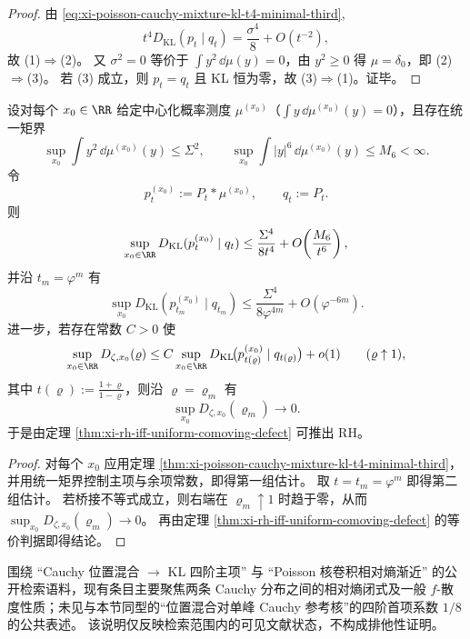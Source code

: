 \begin{proof}
由 \eqref{eq:xi-poisson-cauchy-mixture-kl-t4-minimal-third},
\[
t^4D_{\mathrm{KL}}(p_t\mid q_t)=\frac{\sigma^4}{8}+O(t^{-2}),
\]
故 (1)\(\Rightarrow\)(2)。
又 \(\sigma^2=0\) 等价于 \(\int y^2\,\dd\mu(y)=0\)，由 \(y^2\ge0\) 得 \(\mu=\delta_0\)，即 (2)\(\Rightarrow\)(3)。
若 (3) 成立，则 \(p_t=q_t\) 且 KL 恒为零，故 (3)\(\Rightarrow\)(1)。证毕。
\end{proof}

\begin{corollary}[统一矩界与桥接接口下的条件推导]\label{thm:xi-poisson-kl-bridge-variance-necessary-condition}\label{cor:xi-poisson-kl-bridge-main-channel-dichotomy}
设对每个 \(x_0\in\RR\) 给定中心化概率测度 \(\mu^{(x_0)}\)（\(\int y\,\dd\mu^{(x_0)}(y)=0\)），且存在统一矩界
\[
\sup_{x_0}\int y^2\,\dd\mu^{(x_0)}(y)\le \Sigma^2,
\qquad
\sup_{x_0}\int |y|^6\,\dd\mu^{(x_0)}(y)\le M_6<\infty.
\]
令
\[
p_t^{(x_0)}:=P_t*\mu^{(x_0)},\qquad q_t:=P_t.
\]
则
\[
\sup_{x_0\in\RR}D_{\mathrm{KL}}(p_t^{(x_0)}\mid q_t)
\le
\frac{\Sigma^4}{8t^4}
+O\!\left(\frac{M_6}{t^6}\right),
\]
并沿 \(t_m=\varphi^m\) 有
\[
\sup_{x_0}D_{\mathrm{KL}}(p_{t_m}^{(x_0)}\mid q_{t_m})
\le
\frac{\Sigma^4}{8\varphi^{4m}}
+O(\varphi^{-6m}).
\]
进一步，若存在常数 \(C>0\) 使
\[
\sup_{x_0\in\RR}D_{\zeta,x_0}(\varrho)
\le
C\sup_{x_0\in\RR}D_{\mathrm{KL}}\!\bigl(p_{t(\varrho)}^{(x_0)}\mid q_{t(\varrho)}\bigr)
+o(1)
\qquad(\varrho\uparrow1),
\]
其中 \(t(\varrho):=\frac{1+\varrho}{1-\varrho}\)，则沿 \(\varrho=\varrho_m\) 有
\[
\sup_{x_0}D_{\zeta,x_0}(\varrho_m)\to0.
\]
于是由定理 \ref{thm:xi-rh-iff-uniform-comoving-defect} 可推出 \(\mathrm{RH}\)。
\end{corollary}

\begin{proof}
对每个 \(x_0\) 应用定理 \ref{thm:xi-poisson-cauchy-mixture-kl-t4-minimal-third}，并用统一矩界控制主项与余项常数，即得第一组估计。
取 \(t=t_m=\varphi^m\) 即得第二组估计。
若桥接不等式成立，则右端在 \(\varrho_m\uparrow1\) 时趋于零，从而 \(\sup_{x_0}D_{\zeta,x_0}(\varrho_m)\to0\)。
再由定理 \ref{thm:xi-rh-iff-uniform-comoving-defect} 的等价判据即得结论。
\end{proof}

\begin{remark}[公开检索范围说明]\label{rem:xi-poisson-cauchy-kl-one-eighth-public-index-note}
围绕 ``Cauchy 位置混合 \(\to\) KL 四阶主项'' 与 ``Poisson 核卷积相对熵渐近'' 的公开检索语料，现有条目主要聚焦两条 Cauchy 分布之间的相对熵闭式及一般 \(f\)-散度性质；未见与本节同型的“位置混合对单峰 Cauchy 参考核”的四阶首项系数 \(1/8\) 的公共表述。
该说明仅反映检索范围内的可见文献状态，不构成排他性证明。
\end{remark}

\endinput
